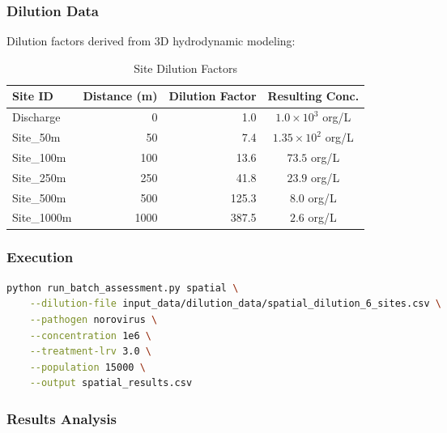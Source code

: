 \documentclass[11pt,a4paper]{article}
\begin{document}
\subsubsection{Dilution Data}

Dilution factors derived from 3D hydrodynamic modeling:

\begin{table}[H]
\centering
\caption{Site Dilution Factors}
\begin{tabular}{lrrc}
\toprule
\textbf{Site ID} & \textbf{Distance (m)} & \textbf{Dilution Factor} & \textbf{Resulting Conc.} \\
\midrule
Discharge & 0 & 1.0 & $1.0 \times 10^3$ org/L \\
Site\_50m & 50 & 7.4 & $1.35 \times 10^2$ org/L \\
Site\_100m & 100 & 13.6 & $73.5$ org/L \\
Site\_250m & 250 & 41.8 & $23.9$ org/L \\
Site\_500m & 500 & 125.3 & $8.0$ org/L \\
Site\_1000m & 1000 & 387.5 & $2.6$ org/L \\
\bottomrule
\end{tabular}
\end{table}

\subsubsection{Execution}

\begin{lstlisting}[style=bashstyle, language=bash]
python run_batch_assessment.py spatial \
    --dilution-file input_data/dilution_data/spatial_dilution_6_sites.csv \
    --pathogen norovirus \
    --concentration 1e6 \
    --treatment-lrv 3.0 \
    --population 15000 \
    --output spatial_results.csv
\end{lstlisting}

\subsubsection{Results Analysis}
\end{document}
